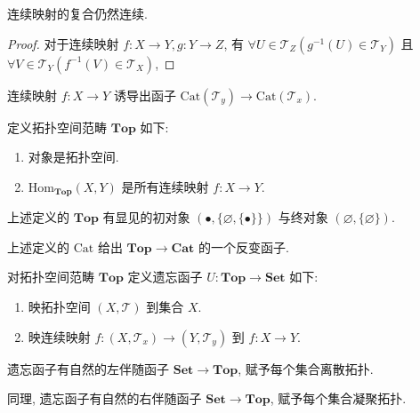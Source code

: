 \begin{lemma}
    连续映射的复合仍然连续.

    \begin{proof}
        对于连续映射 \(f : X \to Y, g : Y \to Z\), 有 \(\forall U \in \mathcal{T}_Z (g^{-1} (U) \in \mathcal{T}_Y)\) 且 \(\forall V \in \mathcal{T}_Y (f^{-1} (V) \in \mathcal{T}_X)\),
    \end{proof}
\end{lemma}

\begin{corollary}
    连续映射 \(f : X \to Y\) 诱导出函子 \(\mathrm{Cat} (\mathcal{T}_y) \to \mathrm{Cat} (\mathcal{T}_x)\).
\end{corollary}

\begin{definition}
    定义拓扑空间范畴 \(\mathbf{Top}\) 如下:
    \begin{enumerate}
        \item 对象是拓扑空间.
        \item \(\mathrm{Hom}_{\mathbf{Top}} (X,Y)\) 是所有连续映射 \(f : X \to Y\).
    \end{enumerate}
\end{definition}

\begin{corollary}
    上述定义的 \(\mathbf{Top}\) 有显见的初对象 \(({\bullet},\{\varnothing, \{\bullet\}\})\) 与终对象
    \((\varnothing,\{\varnothing\})\).
\end{corollary}

\begin{corollary}
    上述定义的 \(\mathrm{Cat}\) 给出 \(\mathbf{Top} \to \mathbf{Cat}\) 的一个反变函子.
\end{corollary}

\begin{definition}
    对拓扑空间范畴 \(\mathbf{Top}\) 定义遗忘函子 \(U : \mathbf{Top} \to \mathbf{Set}\) 如下:

    \begin{enumerate}
        \item 映拓扑空间 \((X,\mathcal{T})\) 到集合 \(X\).
        \item 映连续映射 \(f : (X,\mathcal{T}_x) \to (Y,\mathcal{T}_y)\) 到 \(f : X \to Y\).
    \end{enumerate}
\end{definition}

\begin{lemma}
    遗忘函子有自然的左伴随函子 \(\mathbf{Set} \to \mathbf{Top}\), 赋予每个集合离散拓扑.

    同理, 遗忘函子有自然的右伴随函子 \(\mathbf{Set} \to \mathbf{Top}\), 赋予每个集合凝聚拓扑.
\end{lemma}

